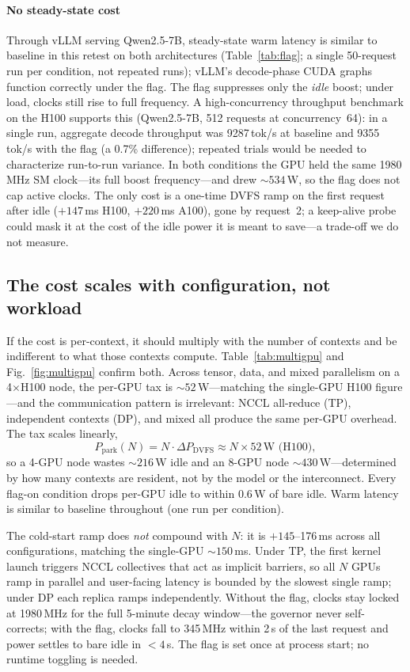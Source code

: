 \documentclass[conference]{IEEEtran}
\begin{document}
\paragraph{No steady-state cost}
Through vLLM serving Qwen2.5-7B, steady-state warm latency is similar to baseline in this retest on both architectures (Table~\ref{tab:flag}; a single 50-request run per condition, not repeated runs); vLLM's decode-phase CUDA graphs function correctly under the flag. The flag suppresses only the \emph{idle} boost; under load, clocks still rise to full frequency. A high-concurrency throughput benchmark on the H100 supports this (Qwen2.5-7B, 512 requests at concurrency~64): in a single run, aggregate decode throughput was 9287\,tok/s at baseline and 9355\,tok/s with the flag (a 0.7\% difference); repeated trials would be needed to characterize run-to-run variance. In both conditions the GPU held the same 1980\,MHz SM clock---its full boost frequency---and drew ${\sim}534$\,W, so the flag does not cap active clocks. The only cost is a one-time DVFS ramp on the first request after idle ($+147$\,ms H100, $+220$\,ms A100), gone by request~2; a keep-alive probe could mask it at the cost of the idle power it is meant to save---a trade-off we do not measure.

\subsection{The cost scales with configuration, not workload}
If the cost is per-context, it should multiply with the number of contexts and be indifferent to what those contexts compute. Table~\ref{tab:multigpu} and Fig.~\ref{fig:multigpu} confirm both. Across tensor, data, and mixed parallelism on a 4$\times$H100 node, the per-GPU tax is ${\sim}52$\,W---matching the single-GPU H100 figure---and the communication pattern is irrelevant: NCCL all-reduce (TP), independent contexts (DP), and mixed all produce the same per-GPU overhead. The tax scales linearly,
\begin{equation}
P_{\text{park}}(N) = N \cdot \Delta P_{\text{DVFS}} \approx N \times 52\,\text{W (H100)},
\label{eq:linear}
\end{equation}
so a 4-GPU node wastes ${\sim}216$\,W idle and an 8-GPU node ${\sim}430$\,W---determined by how many contexts are resident, not by the model or the interconnect. Every flag-on condition drops per-GPU idle to within 0.6\,W of bare idle. Warm latency is similar to baseline throughout (one run per condition).

The cold-start ramp does \emph{not} compound with $N$: it is $+145$--176\,ms across all configurations, matching the single-GPU ${\sim}150$\,ms. Under TP, the first kernel launch triggers NCCL collectives that act as implicit barriers, so all $N$ GPUs ramp in parallel and user-facing latency is bounded by the slowest single ramp; under DP each replica ramps independently. Without the flag, clocks stay locked at 1980\,MHz for the full 5-minute decay window---the governor never self-corrects; with the flag, clocks fall to 345\,MHz within 2\,s of the last request and power settles to bare idle in $<4$\,s. The flag is set once at process start; no runtime toggling is needed.
\end{document}
